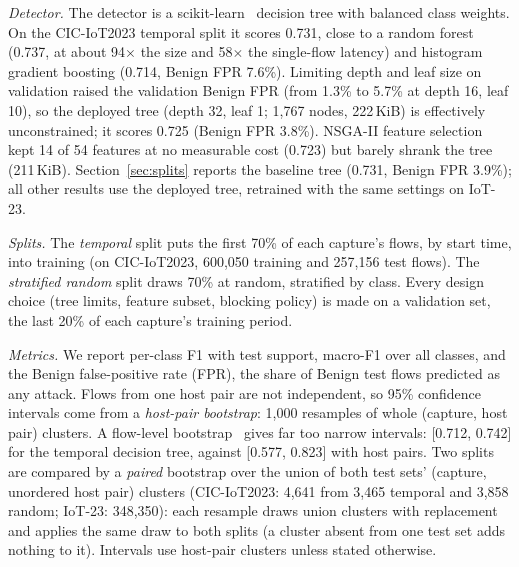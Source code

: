 \emph{Detector.} The detector is a scikit-learn~\cite{pedregosa2011sklearn} decision tree with balanced class weights. On the CIC-IoT2023 temporal split it scores 0.731, close to a random forest (0.737, at about 94$\times$ the size and 58$\times$ the single-flow latency) and histogram gradient boosting (0.714, Benign FPR 7.6\%). Limiting depth and leaf size on validation raised the validation Benign FPR (from 1.3\% to 5.7\% at depth 16, leaf 10), so the deployed tree (depth 32, leaf 1; 1,767 nodes, 222\,KiB) is effectively unconstrained; it scores 0.725 (Benign FPR 3.8\%). NSGA-II feature selection~\cite{deb2002nsga2,blank2020pymoo} kept 14 of 54 features at no measurable cost (0.723) but barely shrank the tree (211\,KiB). Section~\ref{sec:splits} reports the baseline tree (0.731, Benign FPR 3.9\%); all other results use the deployed tree, retrained with the same settings on IoT-23.

\emph{Splits.} The \emph{temporal} split puts the first 70\% of each capture's flows, by start time, into training (on CIC-IoT2023, 600,050 training and 257,156 test flows). The \emph{stratified random} split draws 70\% at random, stratified by class. Every design choice (tree limits, feature subset, blocking policy) is made on a validation set, the last 20\% of each capture's training period.

\emph{Metrics.} We report per-class F1 with test support, macro-F1 over all classes, and the Benign false-positive rate (FPR), the share of Benign test flows predicted as any attack. Flows from one host pair are not independent, so 95\% confidence intervals come from a \emph{host-pair bootstrap}: 1,000 resamples of whole (capture, host pair) clusters. A flow-level bootstrap~\cite{efron1994bootstrap} gives far too narrow intervals: [0.712, 0.742] for the temporal decision tree, against [0.577, 0.823] with host pairs. Two splits are compared by a \emph{paired} bootstrap over the union of both test sets' (capture, unordered host pair) clusters (CIC-IoT2023: 4,641 from 3,465 temporal and 3,858 random; IoT-23: 348,350): each resample draws union clusters with replacement and applies the same draw to both splits (a cluster absent from one test set adds nothing to it). Intervals use host-pair clusters unless stated otherwise.
